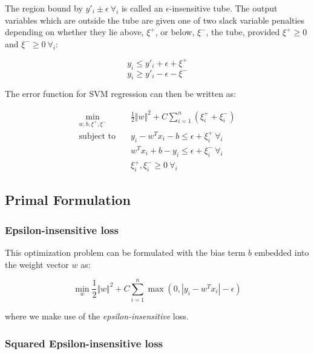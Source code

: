 The region bound by $y'_i\pm\epsilon \ \forall_i$ is called an $\epsilon$-insensitive tube. The output variables which are outside the tube are given one of two slack variable penalties depending on whether they lie above, $\xi^+$, or below, $\xi^-$, the tube, provided $\xi^+ \geq 0$ and $\xi^- \geq 0 \ \forall_i$:

\begin{equation}
    y_i\leq y'_i+\epsilon+\xi^+ \tag{2.4a}
\end{equation}
\begin{equation}
    y_i\geq y'_i-\epsilon-\xi^- \tag{2.4b}
\end{equation}

The error function for SVM regression can then be written as:

\begin{equation}
    \begin{aligned}
        \min_{w,b,\xi^+,\xi^-} \quad & \frac{1}{2}\Vert w\Vert^{2} + C \sum_{i=1}^{n}(\xi_i^+ + \xi_i^-) \\
            \textrm{subject to} \quad & y_i - w^T x_i - b \leq \epsilon + \xi_i^+ \ \forall_i \\ & w^T x_i + b - y_i \leq \epsilon + \xi_i^- \ \forall_i \\ & \xi_i^+, \xi_i^- \geq 0 \ \forall_i
    \end{aligned} \tag{2.5}
\end{equation}

\subsection{Primal Formulation}

\subsubsection{Epsilon-insensitive loss}

This optimization problem can be formulated with the bias term $b$ embedded into the weight vector $w$ as:

\begin{equation}
    \min_ {w} \frac{1}{2} \Vert w\Vert^{2} + C \sum_{i=1}^n \max(0, |y_i - w^T x_i| - \epsilon) \tag{2.6}
\end{equation}

where we make use of the \emph{epsilon-insensitive} loss.

\subsubsection{Squared Epsilon-insensitive loss}

